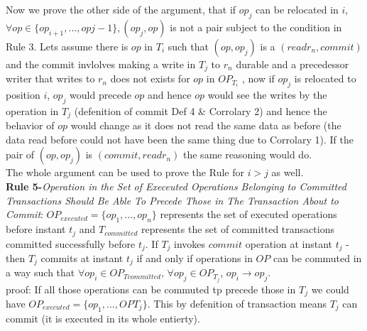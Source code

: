 \documentclass[a4paper, 11pt]{article}
\begin{document}
Now we prove the other side of the argument, that if $op_j$ can be relocated in $i$, $\forall op \in \{op_{i+1}, ..., op{j-1}\}, (op_j, op)$ is not a pair subject to the condition in Rule 3. Lets assume there is $op$ in $T_i$ such that $(op, op_{j})$ is a $({read r_n}, {commit})$  and the commit invlolves making a write in $T_j$ to $r_n$ durable and a precedessor writer that writes to $r_n$ does not exists for $op$ in $OP_{T_i}$ , now if $op_j$ is relocated to position $i$, $op_j$ would precede $op$ and hence $op$ would see the writes by the operation in $T_j$ (defenition of commit Def 4 \& Corrolary  2) and hence the behavior of $op$ would change as it does not read the same data as before (the data read before could not have been the same thing due to Corrolary 1). If the pair of $(op, op_j)$ is $({commit}, {read r_n})$ the same reasoning would do.\\   

The whole argument can be used to prove the Rule for $i > j$ as well.\\

\textbf{Rule 5-}\emph{Operation in the Set of Execeuted Operations Belonging to Committed Transactions Should Be Able To Precede Those in The Transaction About to Commit}: $OP_{executed} = \{op_1,..., op_n\}$ represents the set of executed operations before instant $t_j$ and $T_{committed}$ represents the set of committed transactions committed successfully before $t_j$. If $T_j$ invokes ${commit}$ operation at instant $t_j$ - then $T_j$ commits at instant $t_j$ if and only if operations in $OP$ can be commuted in a way such that $\forall op_i \in OP_{T{committed}}$, $\forall op_j \in OP_{T_j}$, $op_i \rightarrow op_j$.\\


proof: If all those operations can be commuted tp precede those in $T_j$ we could have $OP_{executed} = \{op_1,...,OP{T_j}\}$. This by defenition of transaction means $T_j$ can commit (it is executed in its whole entierty).\\
\end{document}
